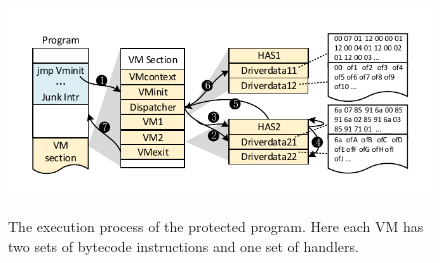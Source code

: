 \begin{figure}[!t]
  \centering
  \includegraphics[width=0.7\columnwidth]{figure/figex.pdf}\\
  \caption{The execution process of the protected program. Here each VM has two sets of bytecode instructions and one set of handlers.}\label{fig:Fig.ex}
\end{figure}